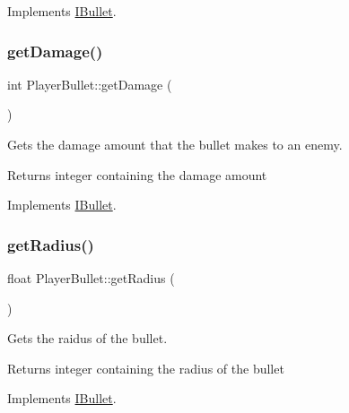Implements \hyperlink{class_i_bullet}{I\+Bullet}.

\mbox{\label{class_player_bullet_a55375b5c3f4f87d00daba1cda12b1e79}} 
\subsubsection{\texorpdfstring{get\+Damage()}{getDamage()}}
{\footnotesize\ttfamily int Player\+Bullet\+::get\+Damage (\begin{DoxyParamCaption}{ }\end{DoxyParamCaption})\hspace{0.3cm}{\ttfamily [virtual]}}



Gets the damage amount that the bullet makes to an enemy. 

\begin{DoxyReturn}{Returns}
integer containing the damage amount 
\end{DoxyReturn}


Implements \hyperlink{class_i_bullet}{I\+Bullet}.

\mbox{\label{class_player_bullet_a1ff56e38b1447500d2887b6fe1eeb674}} 
\subsubsection{\texorpdfstring{get\+Radius()}{getRadius()}}
{\footnotesize\ttfamily float Player\+Bullet\+::get\+Radius (\begin{DoxyParamCaption}{ }\end{DoxyParamCaption})\hspace{0.3cm}{\ttfamily [virtual]}}



Gets the raidus of the bullet. 

\begin{DoxyReturn}{Returns}
integer containing the radius of the bullet 
\end{DoxyReturn}


Implements \hyperlink{class_i_bullet}{I\+Bullet}.

\mbox{\label{class_player_bullet_aa9462c44892190316ee479a18693b6ad}} 
